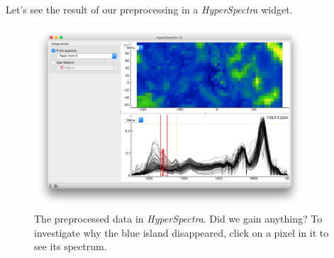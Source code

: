 Let's see the result of our preprocessing in a \textit{HyperSpectra} widget.

\begin{figure}[h]
    \centering
    \includegraphics[width=0.9\textwidth]{graphics/ch-spectral_preprocessing/spectral_preprocessing-fig3.png}
    \caption{The preprocessed data in \textit{HyperSpectra}. Did we gain anything? To investigate why the blue island disappeared, click on a pixel in it to see its spectrum.}
    \label{fig:spectral_preprocessing-fig3}
\end{figure}
